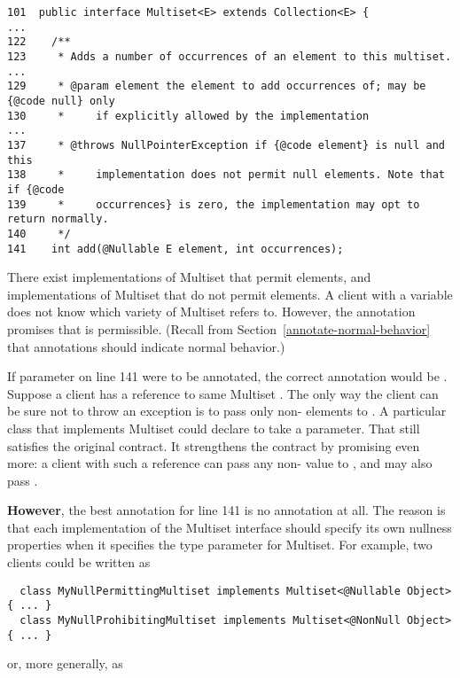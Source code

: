 \begin{Verbatim}
101  public interface Multiset<E> extends Collection<E> {
...
122    /**
123     * Adds a number of occurrences of an element to this multiset.
...
129     * @param element the element to add occurrences of; may be {@code null} only
130     *     if explicitly allowed by the implementation
...
137     * @throws NullPointerException if {@code element} is null and this
138     *     implementation does not permit null elements. Note that if {@code
139     *     occurrences} is zero, the implementation may opt to return normally.
140     */
141    int add(@Nullable E element, int occurrences);
\end{Verbatim}

There exist implementations of Multiset that permit  elements,
and implementations of Multiset that do not permit  elements.  A
client with a variable  does not know which variety of
Multiset  refers to.  However, the  annotation
promises that  is permissible.  (Recall from
Section~\ref{annotate-normal-behavior} that annotations should indicate
normal behavior.)

If parameter  on line 141 were to be annotated, the correct
annotation would be .  Suppose a client has a reference to
same Multiset .  The only way the client can be sure not to throw an exception is to pass
only non- elements to .  A particular class
that implements Multiset could declare  to take a
 parameter.  That still satisfies the original contract.
It strengthens the contract by promising even more:  a client with such a
reference can pass any non- value to , and may also
pass .

\textbf{However}, the best annotation for line 141 is no annotation at all.
The reason is that each implementation of the Multiset interface should
specify its own nullness properties when it specifies the type parameter
for Multiset.  For example, two clients could be written as

\begin{Verbatim}
  class MyNullPermittingMultiset implements Multiset<@Nullable Object> { ... }
  class MyNullProhibitingMultiset implements Multiset<@NonNull Object> { ... }
\end{Verbatim}

\noindent
or, more generally, as

